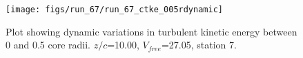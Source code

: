\begin{figure}[H]
\centering
\texttt{[image: figs/run\_67/run\_67\_ctke\_005rdynamic]}
\caption{Plot showing dynamic variations in turbulent kinetic energy between 0 and 0.5 core radii. $z/c$=10.00, $V_{free}$=27.05, station 7.}
\end{figure}


